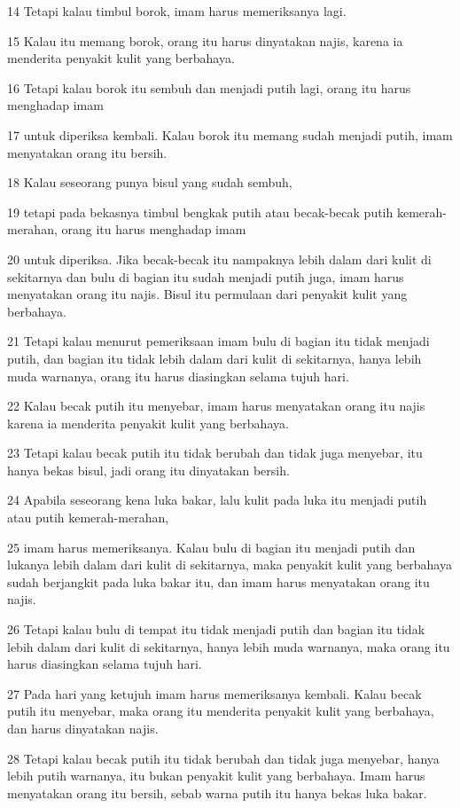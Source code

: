 \par 14 Tetapi kalau timbul borok, imam harus memeriksanya lagi.
\par 15 Kalau itu memang borok, orang itu harus dinyatakan najis, karena ia menderita penyakit kulit yang berbahaya.
\par 16 Tetapi kalau borok itu sembuh dan menjadi putih lagi, orang itu harus menghadap imam
\par 17 untuk diperiksa kembali. Kalau borok itu memang sudah menjadi putih, imam menyatakan orang itu bersih.
\par 18 Kalau seseorang punya bisul yang sudah sembuh,
\par 19 tetapi pada bekasnya timbul bengkak putih atau becak-becak putih kemerah-merahan, orang itu harus menghadap imam
\par 20 untuk diperiksa. Jika becak-becak itu nampaknya lebih dalam dari kulit di sekitarnya dan bulu di bagian itu sudah menjadi putih juga, imam harus menyatakan orang itu najis. Bisul itu permulaan dari penyakit kulit yang berbahaya.
\par 21 Tetapi kalau menurut pemeriksaan imam bulu di bagian itu tidak menjadi putih, dan bagian itu tidak lebih dalam dari kulit di sekitarnya, hanya lebih muda warnanya, orang itu harus diasingkan selama tujuh hari.
\par 22 Kalau becak putih itu menyebar, imam harus menyatakan orang itu najis karena ia menderita penyakit kulit yang berbahaya.
\par 23 Tetapi kalau becak putih itu tidak berubah dan tidak juga menyebar, itu hanya bekas bisul, jadi orang itu dinyatakan bersih.
\par 24 Apabila seseorang kena luka bakar, lalu kulit pada luka itu menjadi putih atau putih kemerah-merahan,
\par 25 imam harus memeriksanya. Kalau bulu di bagian itu menjadi putih dan lukanya lebih dalam dari kulit di sekitarnya, maka penyakit kulit yang berbahaya sudah berjangkit pada luka bakar itu, dan imam harus menyatakan orang itu najis.
\par 26 Tetapi kalau bulu di tempat itu tidak menjadi putih dan bagian itu tidak lebih dalam dari kulit di sekitarnya, hanya lebih muda warnanya, maka orang itu harus diasingkan selama tujuh hari.
\par 27 Pada hari yang ketujuh imam harus memeriksanya kembali. Kalau becak putih itu menyebar, maka orang itu menderita penyakit kulit yang berbahaya, dan harus dinyatakan najis.
\par 28 Tetapi kalau becak putih itu tidak berubah dan tidak juga menyebar, hanya lebih putih warnanya, itu bukan penyakit kulit yang berbahaya. Imam harus menyatakan orang itu bersih, sebab warna putih itu hanya bekas luka bakar.
